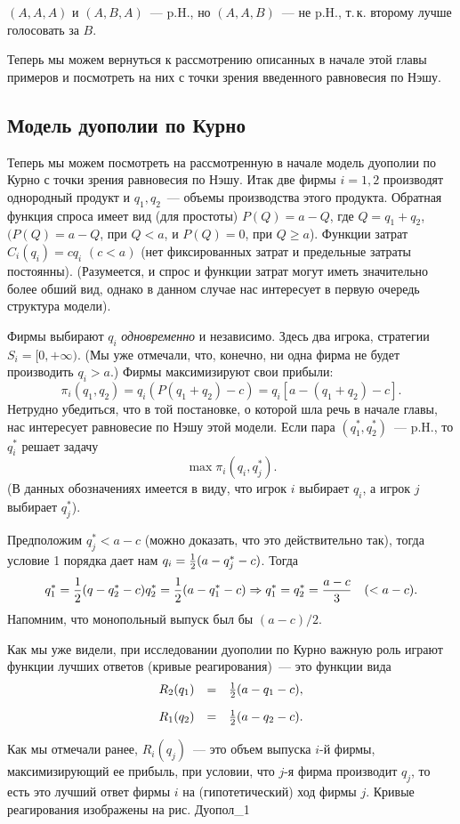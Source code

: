 \documentclass[12pt]{article}
\begin{document}
{$(A,A,A)$ и $(A,B,A)$~--- p.H.,  но $(A,A,B)$~--- не p.H., т.\,к.
второму лучше голосовать за $B$.

Теперь мы можем вернуться к рассмотрению описанных в начале этой
главы примеров и посмотреть на них с точки зрения введенного
равновесия по Нэшу.

\subsection{Модель дуополии по Курно}


Теперь мы можем посмотреть на рассмотренную в начале модель
дуополии по Курно с точки зрения равновесия по Нэшу.
Итак две фирмы $i=1,2$ производят однородный продукт и $q_1,q_2$~---
объемы производства этого продукта. Обратная функция спроса имеет
вид (для простоты) $P(Q)=a-Q$, где $Q=q_1+q_2$, $(P(Q)=a-Q$, при
$Q<a$, и $P(Q)=0$, при $Q\ge a$).  Функции затрат $C_i(q_i)=cq_i$
$(c<a)$ (нет фиксированных затрат и предельные затраты постоянны).
(Разумеется, и спрос и функции затрат могут иметь значительно более
обший вид, однако в данном случае нас интересует в первую очередь
структура модели).

Фирмы выбирают $q_i$ {\it одновременно} и независимо. Здесь два
игрока, стратегии $S_i=[0,+\infty)$. (Мы уже отмечали, что, конечно,
ни одна фирма не будет производить $q_i>a$.) Фирмы максимизируют
свои прибыли:
$$
\pi_i(q_1,q_2)=q_i(P(q_1+q_2)-c)=q_i[a-(q_1+q_2)-c].
$$
Нетрудно убедиться, что в той постановке, о которой шла речь в
начале главы, нас интересует равновесие по Нэшу этой модели. Если
пара $(q^*_1,q^*_2)$~--- p.H., то $q^*_i$ решает задачу
$$
\max\pi_i(q_i,q^*_j).
$$
(В данных обозначениях имеется в виду, что игрок $i$ выбирает $q_i$,
а игрок $j$ выбирает $q^*_j$).


Предположим $q^*_j<a-c$ (можно доказать, что это действительно так),
тогда условие 1 порядка дает нам
$q_i={1\over 2}(a-q^*_j-c)$. Тогда
$$
{q^*_1={1\over 2}(q-q^*_2-c) q^*_2={1\over
2}(a-q^*_1-c)}\Rightarrow q^*_1=q^*_2={{a-c}\over 3}\quad (<a-c).
$$
Напомним, что монопольный выпуск был бы $(a-c)/2$.

Как мы уже видели, при исследовании дуополии по Курно важную роль
играют функции лучших ответов (кривые реагирования)~--- это функции
вида
$$
\begin{array}{rcl}
R_2(q_1)&=&{1\over 2}(a-q_1-c),\\[10pt]
R_1(q_2)&=&{1\over 2}(a-q_2-c). \end{array}
$$

Как мы отмечали ранее, $R_i(q_j)$~--- это объем выпуска $i$-й фирмы,
максимизирующий ее прибыль, при условии, что $j$-я фирма производит
$q_j$, то есть это лучший ответ фирмы $i$ на (гипотетический) ход фирмы $j$.
Кривые реагирования изображены на рис. Дуопол_1


}
\end{document}
